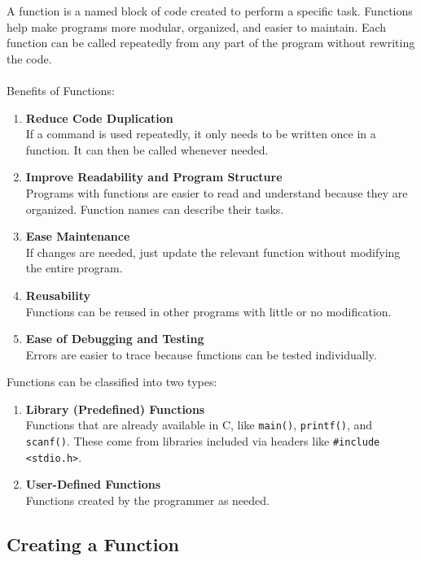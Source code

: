 A function is a named block of code created to perform a specific task.  
Functions help make programs more modular, organized, and easier to maintain.  
Each function can be called repeatedly from any part of the program without rewriting the code.
\\\\Benefits of Functions:
\begin{enumerate}
    \item \textbf{Reduce Code Duplication} \\  
    If a command is used repeatedly, it only needs to be written once in a function.  
    It can then be called whenever needed.
    
    \item \textbf{Improve Readability and Program Structure} \\  
    Programs with functions are easier to read and understand because they are organized.  
    Function names can describe their tasks.
    
    \item \textbf{Ease Maintenance} \\  
    If changes are needed, just update the relevant function without modifying the entire program.
    
    \item \textbf{Reusability} \\  
    Functions can be reused in other programs with little or no modification.
    
    \item \textbf{Ease of Debugging and Testing} \\  
    Errors are easier to trace because functions can be tested individually.
\end{enumerate}
Functions can be classified into two types:
\begin{enumerate}
    \item \textbf{Library (Predefined) Functions} \\  
    Functions that are already available in C, like \verb|main()|, \verb|printf()|, and \verb|scanf()|.  
    These come from libraries included via headers like \verb|#include <stdio.h>|.
    
    \item \textbf{User-Defined Functions} \\  
    Functions created by the programmer as needed.
\end{enumerate}

\subsection{Creating a Function}

